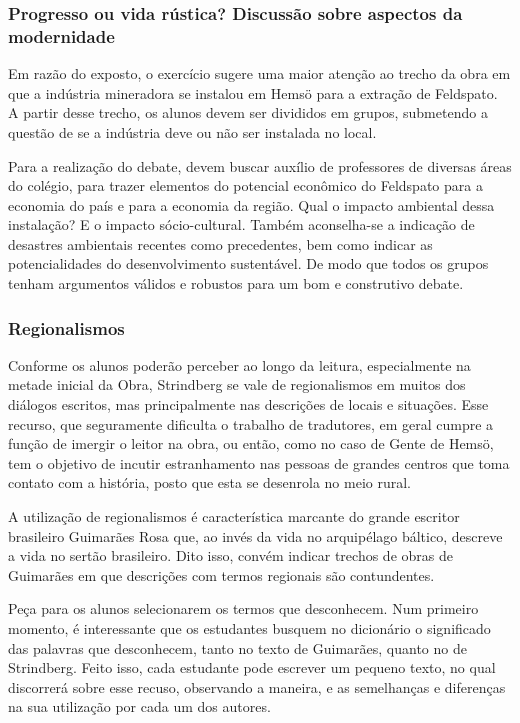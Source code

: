 \documentclass[12pt]{extarticle}
\begin{document}
\subsubsection{Progresso ou vida rústica? Discussão sobre aspectos da modernidade}


Em razão do exposto, o exercício sugere uma maior atenção ao trecho da
obra em que a indústria mineradora se instalou em Hemsö para a
extração de Feldspato. A partir desse trecho, os alunos devem ser
divididos em grupos, submetendo a questão de se a indústria deve ou
não ser instalada no local.

Para a realização do debate, devem buscar auxílio de professores de
diversas áreas do colégio, para trazer elementos do potencial econômico
do Feldspato para a economia do país e para a economia da região. Qual o
impacto ambiental dessa instalação? E o impacto sócio-cultural. Também
aconselha-se a indicação de desastres ambientais recentes como
precedentes, bem como indicar as potencialidades do desenvolvimento
sustentável. De modo que todos os grupos tenham argumentos válidos e
robustos para um bom e construtivo debate.

\subsubsection{Regionalismos}


Conforme os alunos poderão perceber ao longo da leitura, especialmente
na metade inicial da Obra, Strindberg se vale de regionalismos em
muitos dos diálogos escritos, mas principalmente nas descrições de
locais e situações. Esse recurso, que seguramente dificulta o trabalho
de tradutores, em geral cumpre a função de imergir o leitor na obra,
ou então, como no caso de Gente de Hemsö, tem o objetivo de incutir
estranhamento nas pessoas de grandes centros que toma contato com a
história, posto que esta se desenrola no meio rural.

A utilização de regionalismos é característica marcante do grande
escritor brasileiro Guimarães Rosa que, ao invés da vida no arquipélago
báltico, descreve a vida no sertão brasileiro. Dito isso, convém indicar
trechos de obras de Guimarães em que descrições com termos regionais são
contundentes.

Peça para os alunos selecionarem os termos que desconhecem. Num primeiro
momento, é interessante que os estudantes busquem no dicionário o
significado das palavras que desconhecem, tanto no texto de Guimarães,
quanto no de Strindberg. Feito isso, cada estudante pode escrever um
pequeno texto, no qual discorrerá sobre esse recuso, observando a
maneira, e as semelhanças e diferenças na sua utilização por cada um dos
autores.
\end{document}
